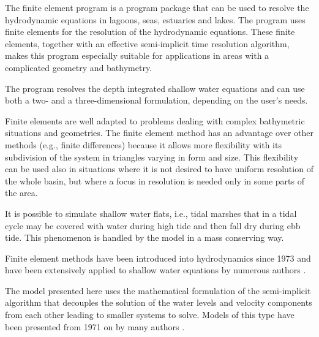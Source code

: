 
The finite element program \shy{} is a program package that can be
used to resolve the hydrodynamic equations in lagoons, seas, estuaries
and lakes. The program uses finite elements for the resolution of
the hydrodynamic equations. These finite elements, together with an
effective semi-implicit time resolution algorithm, makes this program
especially suitable for applications in areas with a complicated geometry
and bathymetry.

The program \shy{} resolves the depth integrated shallow water equations
and can use both a two- and a three-dimensional formulation, depending
on the user's needs.

Finite elements are well adapted to problems dealing with complex
bathymetric situations and geometries.  The finite element method has
an advantage over other methods (e.g., finite differences) because it
allows more flexibility with its subdivision of the system in triangles
varying in form and size.  This flexibility can be used also in situations
where it is not desired to have uniform resolution of the whole basin,
but where a focus in resolution is needed only in some parts of the area.

It is possible to simulate shallow water flats, i.e., tidal marshes
that in a tidal cycle may be covered with water during high tide and
then fall dry during ebb tide. This phenomenon is handled by the model
in a mass conserving way.

Finite element methods have been introduced into hydrodynamics since 1973
and have been extensively applied to shallow water equations by numerous
authors \cite{Grotkop73, Taylor75, Herrling77, Herrling78, Holz82}.


The model presented here \cite{Umgies86, Umgies93} uses the mathematical
formulation of the semi-implicit algorithm that decouples the solution
of the water levels and velocity components from each other leading to
smaller systems to solve. Models of this type have been presented from
1971 on by many authors \cite{Kwizak71, Duwe82, Backhaus83}.

